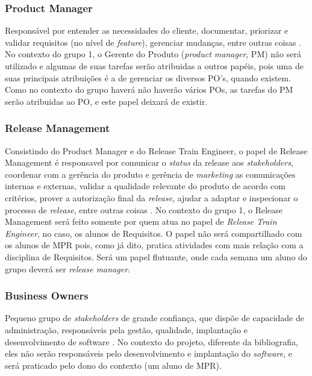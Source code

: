 \subsubsection{Product Manager}
Responsável por entender as necessidades do cliente, documentar, priorizar e validar requisitos (no nível de \emph{feature}), gerenciar mudanças, entre outras coisas \cite[p. 283-287]{safe001}. No contexto do grupo 1, o Gerente do Produto (\emph{product manager}, PM) não será utilizado e algumas de suas tarefas serão atribuidas a outros papéis, pois uma de suas principais atribuições é a de gerenciar os diversos PO's, quando existem. Como no contexto do grupo haverá não haverão vários POs, as tarefas do PM serão atribuidas ao PO, e este papel deixará de existir. %

\subsubsection{Release Management}
Consistindo do Product Manager e do Release Train Engineer, o papel de Release Management é responsavel por comunicar o \emph{status} da release aos \emph{stakeholders}, coordenar com a gerência do produto e gerência de \emph{marketing} as comunicações internas e externas, validar a qualidade relevante do produto de acordo com critérios, prover a autorização final da \emph{release}, ajudar a adaptar e inspecionar o processo de \emph{release}, entre outras coisas \cite{safesite001}.
No contexto do grupo 1, o Release Management será feito somente por quem atua no papel de \emph{Release Train Engineer}, no caso, os alunos de Requisitos. O papel não será compartilhado com os alunos de MPR pois, como já dito, pratica atividades com mais relação com a disciplina de Requisitos. Será um papel flutuante, onde cada semana um aluno do grupo deverá ser \emph{release manager}.

\subsubsection{Business Owners}
Pequeno grupo de \emph{stakeholders} de grande confiança, que dispõe de capacidade de administração, responsáveis pela gestão, qualidade, implantação e desenvolvimento de software \cite{safesite001}. No contexto do projeto, diferente da bibliografia, eles não serão responsáveis pelo desenvolvimento e implantação do \emph{software}, e será praticado pelo dono do contexto (um aluno de MPR).


